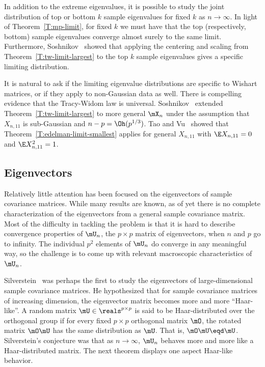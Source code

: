 In addition to the extreme eigenvalues, it is possible to study the joint distribution of top or bottom $k$ sample eigenvalues for fixed $k$ as
$n \to \infty$.  In light of Theorem~\ref{T:mp-limit}, for fixed $k$ we must have that the top (respectively, bottom) sample eigenvalues converge almost surely to the same limit.  Furthermore, Soshnikov~\cite{soshnikov2002nud} showed that applying the centering and scaling from Theorem~\ref{T:tw-limit-largest} to the top $k$ sample eigenvalues gives a specific limiting distribution.

It is natural to ask if the limiting eigenvalue distributions are specific to Wishart matrices, or if they apply to non-Gaussian data as well.  There is compelling evidence that the Tracy-Widom law is universal.   Soshnikov~\cite{soshnikov2002nud} extended Theorem~\ref{T:tw-limit-largest} to more general $\mX_n$ under the assumption that $X_{n,11}$ is sub-Gaussian and $n-p = \Oh(p^{1/3})$.  Tao and Vu~\cite{tao2009rmd} showed that Theorem~\ref{T:edelman-limit-smallest} applies for general $X_{n,11}$ with $\E X_{n,11} = 0$ and $\E X_{n,11}^2 = 1$.


\subsection{Eigenvectors}

Relatively little attention has been focused on the eigenvectors of sample covariance matrices.  While many results are known, as of yet there is no complete characterization of the eigenvectors from a general sample covariance matrix.  Most of the difficulty in tackling the problem is that it is hard to describe convergence properties of $\mU_n$, the $p\times p$ matrix of eigenvectors, when $n$ and $p$ go to infinity.  The individual $p^2$ elements of $\mU_n$ do converge in any meaningful way, so the challenge is to come up with relevant macroscopic characteristics of $\mU_n$.

Silverstein~\cite{silverstein1979reg} was perhaps the first to study the eigenvectors of large-dimensional sample covariance matrices.  He hypothesized that for sample covariance matrices of increasing dimension, the eigenvector matrix becomes more and more ``Haar-like''.  A random matrix $\mU \in \reals^{p\times p}$ is said to be Haar-distributed over the orthogonal group if for every fixed $p \times p$ orthogonal matrix $\mO$, the rotated matrix $\mO \mU$ has the same distribution as $\mU$.  That is, $\mO \mU \eqd \mU$.  Silverstein's conjecture was that as $n \to \infty$, $\mU_n$ behaves more and more like a Haar-distributed matrix.  The next theorem displays one aspect Haar-like behavior.

